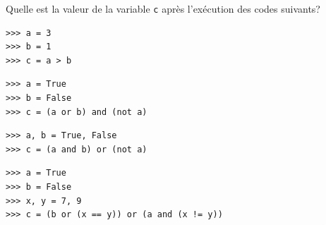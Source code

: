 \begin{exercice_cours}{    Quelle est la valeur de la variable \verb+c+ après l'exécution des codes suivants?}{}


    \begin{minipage}[t]{0.4\linewidth}
\begin{lstlisting}[numbers=none]   
>>> a = 3
>>> b = 1
>>> c = a > b
\end{lstlisting}

\begin{lstlisting}[numbers=none]
>>> a = True
>>> b = False
>>> c = (a or b) and (not a)
\end{lstlisting}

    \end{minipage} \hfill
    \begin{minipage}[t]{0.58\linewidth}
\begin{lstlisting}[numbers=none]
>>> a, b = True, False
>>> c = (a and b) or (not a) 
\end{lstlisting}   

\begin{lstlisting}[numbers=none]
>>> a = True
>>> b = False
>>> x, y = 7, 9
>>> c = (b or (x == y)) or (a and (x != y))
\end{lstlisting}  
    \end{minipage}

\end{exercice_cours}
